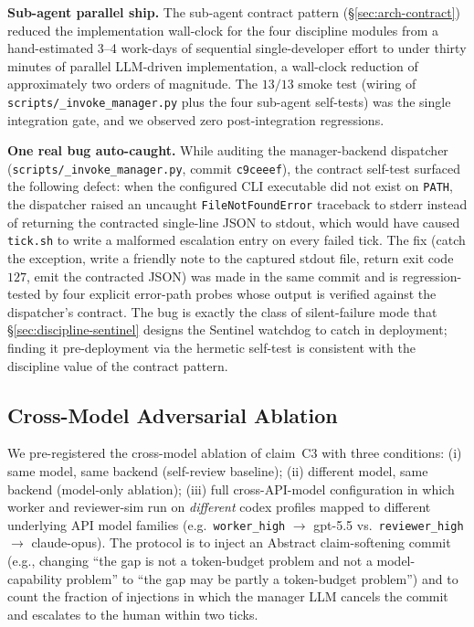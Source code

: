 \textbf{Sub-agent parallel ship.}
The sub-agent contract pattern (\S\ref{sec:arch-contract}) reduced the
implementation wall-clock for the four discipline modules from a
hand-estimated 3--4 work-days of sequential single-developer effort to
under thirty minutes of parallel LLM-driven implementation, a wall-clock
reduction of approximately two orders of magnitude. The \(13/13\) smoke test
(wiring of \texttt{scripts/\_invoke\_manager.py} plus the four sub-agent
self-tests) was the single integration gate, and we observed zero post-integration regressions.

\textbf{One real bug auto-caught.}
While auditing the manager-backend dispatcher
(\texttt{scripts/\_invoke\_manager.py}, commit \texttt{c9ceeef}),
the contract self-test surfaced the following defect: when the
configured CLI executable did not exist on \texttt{PATH}, the
dispatcher raised an uncaught \texttt{FileNotFoundError} traceback to
stderr instead of returning the contracted single-line JSON to stdout,
which would have caused \texttt{tick.sh} to write a malformed
escalation entry on every failed tick. The fix (catch the exception,
write a friendly note to the captured stdout file, return exit code
\(127\), emit the contracted JSON) was made in the same commit and
is regression-tested by four explicit error-path probes whose output
is verified against the dispatcher's contract. The bug is exactly the
class of silent-failure mode that \S\ref{sec:discipline-sentinel}
designs the Sentinel watchdog to catch in deployment; finding it
pre-deployment via the hermetic self-test is consistent with the
discipline value of the contract pattern.

\subsection{Cross-Model Adversarial Ablation}
\label{sec:case-ablation}

We pre-registered the cross-model ablation
of claim~C3 with three conditions: (i) same model, same backend
(self-review baseline); (ii) different model, same backend
(model-only ablation); (iii) full cross-API-model configuration in
which worker and reviewer-sim run on \emph{different} codex profiles
mapped to different underlying API model families
(e.g.\ \texttt{worker\_high} $\to$ gpt-5.5 vs.\ \texttt{reviewer\_high}
$\to$ claude-opus). The protocol is to inject an Abstract
claim-softening commit (e.g., changing ``the gap is not a token-budget
problem and not a model-capability problem'' to ``the gap may be partly
a token-budget problem'') and to count the fraction of injections in
which the manager LLM cancels the commit and escalates to the human
within two ticks.

